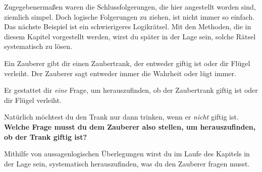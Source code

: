 \documentclass[../../main.tex]{subfiles}
\begin{document}
    Zugegebenermaßen waren die Schlussfolgerungen, die hier angestellt worden sind, ziemlich simpel. Doch logische Folgerungen zu ziehen, ist nicht immer so einfach. Das nächste Beispiel ist ein schwierigeres Logikrätsel. Mit den Methoden, die in diesem Kapitel vorgestellt werden, wirst du später in der Lage sein, solche Rätsel systematisch zu lösen.
    
    \begin{example}{}
        
        Ein Zauberer gibt dir einen Zaubertrank, der entweder giftig ist oder dir Flügel verleiht. Der Zauberer sagt entweder immer die Wahrheit oder lügt immer.
        
        Er gestattet dir \emph{eine} Frage, um herauszufinden, ob der Zaubertrank giftig ist oder dir Flügel verleiht.
        
        Natürlich möchtest du den Trank nur dann trinken, wenn er \emph{nicht} giftig ist. \textbf{Welche Frage musst du dem Zauberer also stellen, um herauszufinden, ob der Trank giftig ist?}
        
        Mithilfe von aussagenlogischen Überlegungen wirst du im Laufe des Kapitels in der Lage sein, systematisch herauszufinden, was du den Zauberer fragen musst.
    \end{example}
    
\end{document}
